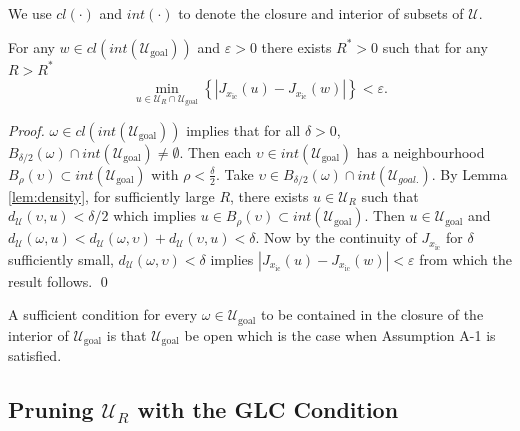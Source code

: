 \documentclass{llncs}
\begin{document}
We use $cl(\cdot)$ and $int(\cdot)$ to denote the closure and interior of subsets of $\mathcal{U}$.
\begin{lemma}
\label{lem:no_limit_points}For any $w\in cl\left(int\left(\mathcal{U}_\mathrm{goal}\right)\right)$
and $\varepsilon>0$ there exists $R^{*}>0$ such that for any $R>R^{*}$
\begin{equation}
\min_{u\in\mathcal{U}_{R}\cap\mathcal{U}_\mathrm{goal}}\left\{ \left|J_{x_\mathrm{ic}}(u)-J_{x_\mathrm{ic}}(w)\right|\right\} <\varepsilon.
\end{equation}
\end{lemma}
\begin{proof}
$\omega\in cl\left(int\left(\mathcal{U}_\mathrm{goal}\right)\right)$ implies
that for all $\delta>0$, $B_{\delta/2}(\omega)\cap int(\mathcal{U}_\mathrm{goal})\neq\emptyset$.
Then each $\upsilon\in int(\mathcal{U}_\mathrm{goal})$ has a neighbourhood
$B_{\rho}(\upsilon)\subset int(\mathcal{U}_\mathrm{goal})$ with $\rho<\frac{\delta}{2}$.
Take $\upsilon\in B_{\delta/2}(\omega)\cap int(\mathcal{U}_{goal.})$.
By Lemma \ref{lem:density}, for sufficiently large $R$, there exists $u\in\mathcal{U}_{R}$ such
that $d_{\mathcal{U}}(\upsilon,u)<\delta/2$ which implies $u\in B_{\rho}(\upsilon)\subset int(\mathcal{U}_\mathrm{goal})$.
Then $u\in\mathcal{U}_\mathrm{goal}$ and $d_{\mathcal{U}}(\omega,u)<d_{\mathcal{U}}(\omega,\upsilon)+d_{\mathcal{U}}(\upsilon,u)<\delta$. Now by the continuity of $J_{x_\mathrm{ic}}$ for $\delta$ sufficiently small, $d_{\mathcal{U}}(\omega,\upsilon)<\delta$ implies $|J_{x_\mathrm{ic}}(u)-J_{x_\mathrm{ic}}(w)| <\varepsilon$ from which the result follows.
\qed
\end{proof}
A sufficient condition for every $\omega\in\mathcal{U}_\mathrm{goal}$ to
be contained in the closure of the interior of $\mathcal{U}_\mathrm{goal}$ is that $\mathcal{U}_\mathrm{goal}$ be open which is the case when Assumption A-1 is satisfied. 
%


\subsection{Pruning $\mathcal{U}_{R}$ with the GLC Condition \label{sec:pruning}}
\end{document}

